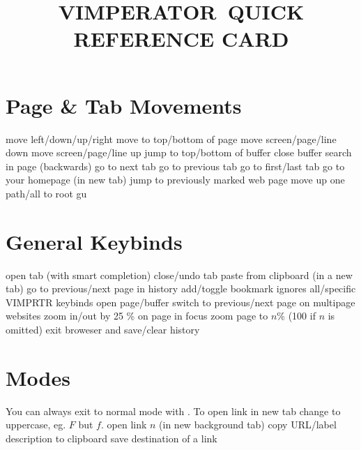 
\def\content{VIMPERATOR}
\def\versionnumber{0.1}  %
\def\year{2014}
\def\month{Jun}
\def\version{v\versionnumber\ \month\ \year}




\title{\uppercase{\content\ quick reference card}}

\shortintro

\vskip 0.5cm

\section{Page \& Tab Movements}{}
	{move left/down/up/right}
	{move to top/bottom of page}
	{move screen/page/line down}
	{move screen/page/line up}
	{jump to top/bottom of buffer}
	{close buffer}
	{search in page (backwards)}
	{go to next tab}
	{go to previous tab}
	{go to first/last tab}
	{go to your homepage (in new tab)}
	{jump to previously marked web page}
	{move up one path/all to root}
	{gu}

\section{General Keybinds}{}
	{open tab (with smart completion)}
	{close/undo tab}
	{paste from clipboard (in a new tab)}
	{go to previous/next page in history}
	{add/toggle bookmark}
	{ignores all/specific VIMPRTR keybinds}
	{open page/buffer}
\cmdS{\lbracket\lbracket~\rbracket\rbracket}	{switch to previous/next page on multipage websites}
\cmdS{+~-}	{zoom in/out by 25 \% on page in focus}
	{zoom page to $n$\% (100 if $n$ is omitted)}
	{exit broweser and save/clear history}

\section{Modes}{You can always exit to normal mode with . To open link
in new tab change to uppercase, eg. $F$ but $f$.}
	{open link $n$ (in new background tab)}
	{copy URL/label description to clipboard}
	{save destination of a link}
